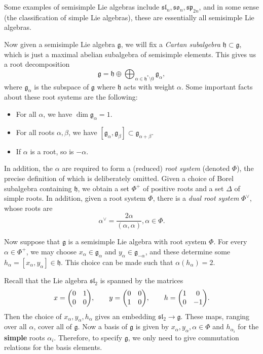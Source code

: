 \documentclass[leqno, openany]{memoir}
\theoremstyle{definition}
\theoremstyle{remark}
\theoremstyle{plain}
\theoremstyle{definition}
\theoremstyle{remark}
\newcommand{\mf}[1]{\mathfrak{#1}}
\begin{document}
Some examples of semisimple Lie algebras include $\mf{sl}_n, \mf{so}_n, \mf{sp}_{2n}$, and in some sense (the classification of simple Lie algebras), these are essentially all semisimple Lie algebras.

Now given a semisimple Lie algebra $\mf{g}$, we will fix a \textit{Cartan subalgebra} $\mf{h} \subset \mf{g}$, which is just a maximal abelian subalgebra of semisimple elements. This gives us a root decomposition
\[ \mf{g} = \mf{h} \oplus \bigoplus_{\alpha \in \mf{h}^* \setminus \qty{0}} \mf{g}_{\alpha}, \]
where $\mf{g}_{\alpha}$ is the subspace of $\mf{g}$ where $\mf{h}$ acts with weight $\alpha$. Some important facts about these root systems are the following:
\begin{itemize}
    \item For all $\alpha$, we have $\dim \mf{g}_{\alpha} = 1$.
    \item For all roots $\alpha, \beta$, we have $[\mf{g}_{\alpha}, \mf{g}_{\beta}] \subset \mf{g}_{\alpha + \beta}$.
    \item If $\alpha$ is a root, so is $-\alpha$.
\end{itemize}
In addition, the $\alpha$ are required to form a (reduced) \textit{root system} (denoted $\Phi$), the precise definition of which is deliberately omitted. Given a choice of Borel subalgebra containing $\mf{h}$, we obtain a set $\Phi^+$ of positive roots and a set $\Delta$ of simple roots. In addition, given a root system $\Phi$, there is a \textit{dual root system} $\Phi^{\vee}$, whose roots are
\[ \alpha^{\vee} = \frac{2 \alpha}{(\alpha, \alpha)}, \alpha \in \Phi. \]

Now suppose that $\mf{g}$ is a semisimple Lie algebra with root system $\Phi$. For every $\alpha \in \Phi^+$, we may choose $x_{\alpha} \in \mf{g}_{\alpha}$ and $y_{\alpha} \in \mf{g}_{-\alpha}$, and these determine some $h_{\alpha} = [x_{\alpha}, y_{\alpha}] \in \mf{h}$. This choice can be made such that $\alpha(h_{\alpha}) = 2$.

Recall that the Lie algebra $\mf{sl}_2$ is spanned by the matrices
\[ x = \mqty(0 & 1 \\ 0 & 0), \qquad y = \mqty(0 & 0 \\ 1 & 0), \qquad h = \mqty(\dmat[0]{1,-1}). \]
Then the choice of $x_{\alpha}, y_{\alpha}, h_{\alpha}$ gives an embedding $\mf{sl}_2 \to \mf{g}$. These maps, ranging over all $\alpha$, cover all of $\mf{g}$. Now a basis of $\mf{g}$ is given by $x_{\alpha}, y_{\alpha}, \alpha \in \Phi$ and $h_{\alpha_i}$ for the \textbf{simple} roots $\alpha_i$. Therefore, to specify $\mf{g}$, we only need to give commutation relations for the basis elements.
\end{document}
